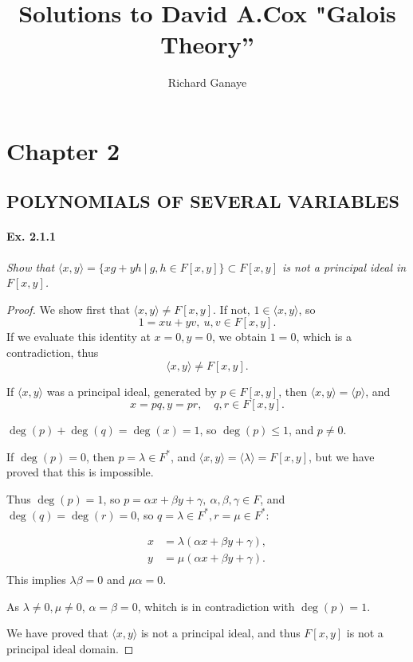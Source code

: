 \documentclass[11pt,a4paper]{article}
\title{Solutions to David A.Cox  "Galois Theory''}
\author{Richard Ganaye}
\begin{document}
\maketitle

\section{Chapter 2}

\subsection{POLYNOMIALS OF SEVERAL VARIABLES}
\paragraph{Ex. 2.1.1}

{\it Show that $\langle x, y \rangle = \{xg+yh\ \vert\  g,h \in F[x,y]\} \subset F[x,y]$ is not a principal ideal in $F[x,y]$.
}

\begin{proof}
We show first that $\langle x,y \rangle \neq F[x,y]$. If not, $1 \in \langle x,y \rangle$, so
$$1 = x u + y v,\ u,v \in F[x,y] .$$
If we evaluate this identity at  $x =0,y=0$, we obtain $1=0$, which is a contradiction, thus
$$\langle x,y \rangle \neq F[x,y].$$

If $\langle x,y \rangle$ was a principal ideal, generated by  $p \in F[x,y]$, then $\langle x,y \rangle = \langle p \rangle$, and
$$x = pq, y = pr, \quad q,r \in F[x,y].$$

$\deg(p)+ \deg(q) = \deg(x) = 1$, so $\deg(p)\leq 1$, and $p\neq 0$.

If $\deg(p)=0$, then $p =\lambda \in F^*$, and $\langle x,y \rangle = \langle \lambda \rangle = F[x,y]$, but we have proved that this is impossible.

Thus $\deg(p)=1$, so $p = \alpha x + \beta y + \gamma,\  \alpha,\beta,\gamma \in F$, and $\deg(q) = \deg(r)=0$, so $q = \lambda \in F^*, r = \mu \in F^*$:

\begin{align*}
x &= \lambda (\alpha x + \beta y + \gamma),\\
y &= \mu (\alpha x + \beta y + \gamma).\\
\end{align*}
This implies $\lambda \beta = 0$ and $\mu \alpha = 0$.

As $\lambda \neq 0, \mu \neq 0$, $\alpha = \beta = 0$, whitch is in contradiction with $\deg(p) = 1$.

We have proved that $\langle x,y \rangle$ is not a principal ideal, and thus $F[x,y]$ is not a principal ideal domain.
\end{proof}
\end{document}
